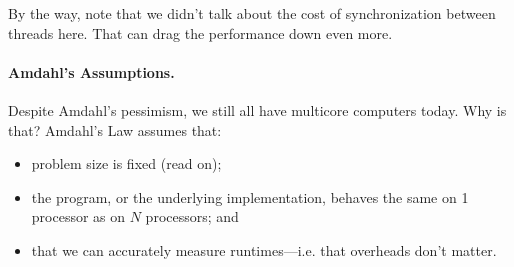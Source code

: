 \documentclass[11pt]{article}
\begin{document}
By the way, note that we didn't talk about the cost of synchronization
between threads here. That can drag the performance down even more.

\paragraph{Amdahl's Assumptions.}
Despite Amdahl's pessimism, we still all have multicore computers today.
Why is that? Amdahl's Law assumes that:
\begin{itemize}
    \item problem size is fixed (read on);
    \item the program, or the underlying implementation, behaves the same on 1 processor as on $N$ processors; and
    \item that we can accurately measure runtimes---i.e. that overheads don't matter.
\end{itemize}
\end{document}
